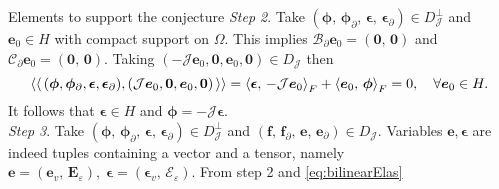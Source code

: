 \begin{conjecture}
\begin{paragraph}{Elements to support the conjecture}
\textit{Step 2}. Take $(\bm{\phi}, \, \bm{\phi}_\partial, \, \bm{\epsilon}, \, \bm{\epsilon}_\partial) \in {D}_{\mathcal{J}}^\perp$ and $\bm{e}_0 \in H$ with compact support on $\Omega$. This implies $\mathcal{B}_\partial \bm{e}_0 = (\bm{0},\, \bm{0})$ and $\mathcal{C}_\partial \bm{e}_0 = (\bm{0},\, \bm{0})$. Taking $(-\mathcal{J}\bm{e}_0, \bm{0}, \bm{e}_0, \bm{0}) \in {D}_{\mathcal{J}}$ then 
\begin{equation*}
\bilprod{(\bm{\phi}, \bm{\phi}_\partial,  \bm{\epsilon}, \bm{\epsilon}_\partial)}{(\mathcal{J}\bm{e}_0, \bm{0}, \bm{e}_0, \bm{0})} = \inner[F]{\bm{\epsilon}}{-\mathcal{J}\bm{e}_0} + \inner[F]{\bm{e}_0}{\bm{\phi}} = 0, \quad \forall \bm{e}_0 \in H.
\end{equation*}
It follows that $\bm{\epsilon} \in H$ and $\bm{\phi}=-\mathcal{J}\bm{\epsilon}$. \\

\textit{Step 3}. Take $(\bm{\phi}, \, \bm{\phi}_\partial, \, \bm{\epsilon}, \, \bm{\epsilon}_\partial) \in {D}_{\mathcal{J}}^\perp$ and $(\bm{f}, \, \bm{f}_\partial, \, \bm{e}, \, \bm{e}_\partial) \in {D}_{\mathcal{J}}$. Variables $\bm{e}, \bm{\epsilon}$ are indeed tuples containing a vector and a tensor, namely $\bm{e} = (\bm{e}_v, \, \bm{E}_\varepsilon), \;\bm{\epsilon} = (\bm{\epsilon}_v, \, \bm{\mathcal{E}}_\varepsilon)$. From step 2 and \eqref{eq:bilinearElas}


\end{paragraph}
\end{conjecture}
